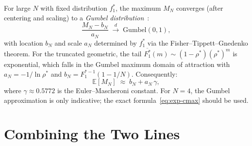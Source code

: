 \documentclass[11pt,a4paper]{article}
\newcommand{\rhostar}{\rho^{*}}
\begin{document}
For large $N$ with fixed distribution $f_1^*$, the maximum $M_N$
converges (after centering and scaling) to a \emph{Gumbel distribution}~\cite{gumbel1958,fisher_tippett1928}:
\begin{equation}
  \frac{M_N - b_N}{a_N} \;\xrightarrow{d}\; \mathrm{Gumbel}(0,1),
  \label{eq:gumbel}
\end{equation}
with location $b_N$ and scale $a_N$ determined by $f_1^*$ via the
Fisher--Tippett--Gnedenko theorem.
For the truncated geometric, the tail $\overline{F_1^*}(m) \sim (1-\rhostar)(\rhostar)^m$
is exponential, which falls in the Gumbel maximum domain of attraction
with $a_N = -1/\ln\rhostar$ and $b_N = F_1^{*-1}(1-1/N)$.
Consequently:
\begin{equation}
  \mathbb{E}[M_N] \;\approx\; b_N + a_N\,\gamma,
  \label{eq:gumbel-mean}
\end{equation}
where $\gamma \approx 0.5772$ is the Euler--Mascheroni constant.
For $N = 4$, the Gumbel approximation is only indicative;
the exact formula~\eqref{eq:exp-cmax} should be used.

\section{Combining the Two Lines}
\end{document}
